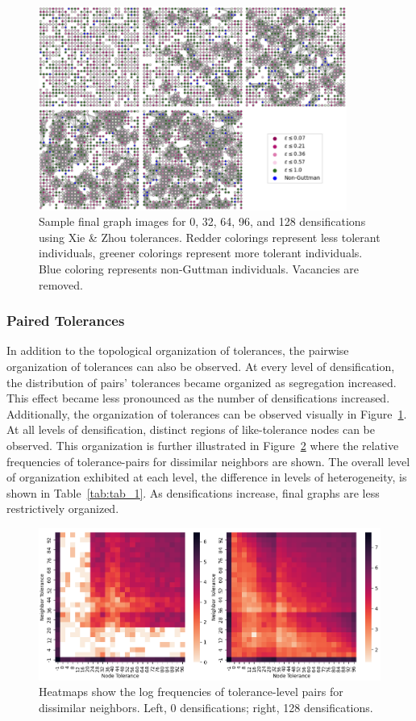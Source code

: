 \documentclass[a4paper]{article}
\begin{document}
\begin{figure}[H]
    \centering
    \includegraphics[width=0.9\textwidth]{fig4.png}
    \caption{Sample final graph images for 0, 32, 64, 96, and 128 densifications using Xie \& Zhou tolerances. Redder colorings represent less tolerant individuals, greener colorings represent more tolerant individuals. Blue coloring represents non-Guttman individuals. Vacancies are removed.}
    \label{fig:fig4}
\end{figure}

\subsubsection{Paired Tolerances}
In addition to the topological organization of tolerances, the pairwise organization of tolerances can also be observed. At every level of densification, the distribution of pairs’ tolerances became organized as segregation increased. This effect became less pronounced as the number of densifications increased. Additionally, the organization of tolerances can be observed visually in Figure~\ref*{fig:fig4}. At all levels of densification, distinct regions of like-tolerance nodes can be observed. This organization is further illustrated in Figure~\ref*{fig:fig5} where the relative frequencies of tolerance-pairs for dissimilar neighbors are shown. The overall level of organization exhibited at each level, the difference in levels of heterogeneity, is shown in Table~\ref*{tab:tab_1}. As densifications increase, final graphs are less restrictively organized.

\begin{figure}[H]
    \centering
    \includegraphics[width=.9\textwidth]{fig5b.png}
    \caption{Heatmaps show the log frequencies of tolerance-level pairs for dissimilar neighbors. Left, 0 densifications; right, 128 densifications.}
    \label{fig:fig5}
\end{figure}
\end{document}
